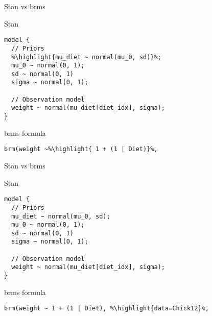 \documentclass[finnish,english,t]{beamer}
\newcommand{\reducedstrut}{\vrule width 0pt height .9\ht\strutbox depth .9\dp\strutbox\relax}
\newcommand{\highlight}[1]{%
  \begingroup
  \setlength{\fboxsep}{0pt}%
  \colorbox{yellow!30}{\reducedstrut\detokenize{#1}\/}%
  \endgroup
}
\begin{document}
\begin{frame}[fragile]{Stan vs brms}

  \vspace{-0.5\baselineskip}

  Stan
  
\vspace{-0.5\baselineskip}
{\small
\begin{verbatim}
model {
  // Priors
  %\highlight{mu_diet ~ normal(mu_0, sd)}%;
  mu_0 ~ normal(0, 1);
  sd ~ normal(0, 1)
  sigma ~ normal(0, 1);
  
  // Observation model
  weight ~ normal(mu_diet[diet_idx], sigma);
}
\end{verbatim}

\vspace{-\baselineskip}
{\color{lightgray}\hrulefill}

  brms formula
  \vspace{-0.5\baselineskip}
\begin{verbatim}  
brm(weight ~%\highlight{ 1 + (1 | Diet)}%,
\end{verbatim}
}

\end{frame}

\begin{frame}[fragile]{Stan vs brms}

  \vspace{-0.5\baselineskip}

  Stan
  
\vspace{-0.5\baselineskip}
{\small
\begin{verbatim}
model {
  // Priors
  mu_diet ~ normal(mu_0, sd);
  mu_0 ~ normal(0, 1);
  sd ~ normal(0, 1)
  sigma ~ normal(0, 1);
  
  // Observation model
  weight ~ normal(mu_diet[diet_idx], sigma);
}
\end{verbatim}

\vspace{-\baselineskip}
{\color{lightgray}\hrulefill}

  brms formula
  \vspace{-0.5\baselineskip}
\begin{verbatim}
brm(weight ~ 1 + (1 | Diet), %\highlight{data=Chick12}%,
\end{verbatim}
}

\end{frame}
\end{document}
